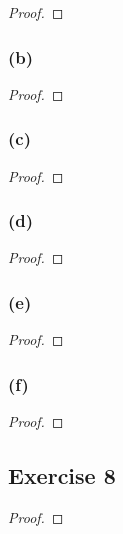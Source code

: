 \documentclass[14pt]{extarticle}
\begin{document}
\begin{proof}

\end{proof}

\subsubsection{(b)}

\begin{proof}

\end{proof}

\subsubsection{(c)}

\begin{proof}

\end{proof}

\subsubsection{(d)}

\begin{proof}

\end{proof}

\subsubsection{(e)}

\begin{proof}

\end{proof}

\subsubsection{(f)}

\begin{proof}

\end{proof}

\subsection{Exercise 8}

\begin{proof}

\end{proof}
\end{document}
